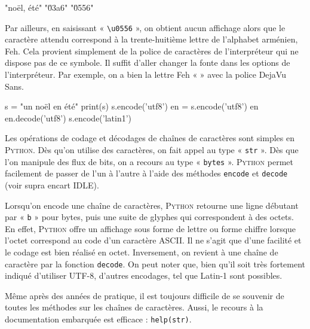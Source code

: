 \begin{idleconsole}
	\begin{pyconsole}
		"noël, été"
		"\u03a6"
		"\u0556"
	\end{pyconsole}
\end{idleconsole}

Par ailleurs, en saisissant « \texttt{\textbackslash{u}0556} », on obtient aucun affichage alors que le caractère attendu correspond à la trente-huitième lettre de l'alphabet arménien, Feh. Cela provient simplement de la police de caractères de l'interpréteur qui ne dispose pas de ce symbole. Il suffit d'aller changer la fonte dans les options de l'interpréteur. Par exemple, on a bien la lettre Feh « {} » avec la police DejaVu Sans.

\begin{idleconsole}
	\begin{pyconsole}
		s = "un noël en été"
		print(s)
		s.encode('utf8')
		en = s.encode('utf8')
		en
		en.decode('utf8')
		s.encode('latin1')
	\end{pyconsole}
\end{idleconsole}

Les opérations de codage et décodages de chaînes de caractères sont simples en \textsc{Python}. Dès qu'on utilise des caractères, on fait appel au type « \texttt{str} ». Dès que l'on manipule des flux de bits, on a recours au type « \texttt{bytes} ». \textsc{Python} permet facilement de passer de l'un à l'autre à l'aide des méthodes \texttt{encode} et \texttt{decode} (voir supra encart IDLE).

Lorsqu'on encode une chaîne de caractères, \textsc{Python} retourne une ligne débutant par  « \texttt{b} » pour bytes, puis une suite de glyphes qui correspondent à des octets. En effet, \textsc{Python} offre un affichage sous forme de lettre ou forme chiffre lorsque l'octet correspond au code d'un caractère ASCII. Il ne s'agit que d'une facilité et le codage est bien réalisé en octet. Inversement, on revient à une chaîne de caractère par la fonction \texttt{decode}. On peut noter que, bien qu'il soit très fortement indiqué d'utiliser UTF-8, d'autres encodages, tel que Latin-1 sont possibles.


Même après des années de pratique, il est toujours difficile de se souvenir de toutes les méthodes sur les chaînes de caractères. Aussi, le recours à la documentation embarquée est efficace : \texttt{help(str)}.

